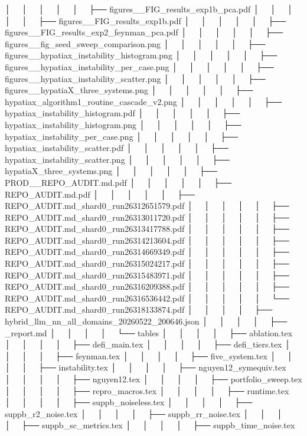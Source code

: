│   │       │   │   │   ├── figures__FIG_results_exp1b_pca.pdf
│   │       │   │   │   ├── figures__FIG_results_exp1b.pdf
│   │       │   │   │   ├── figures__FIG_results_exp2_feynman_pca.pdf
│   │       │   │   │   ├── figures__fig_seed_sweep_comparison.png
│   │       │   │   │   ├── figures__hypatiax_instability_histogram.png
│   │       │   │   │   ├── figures__hypatiax_instability_per_case.png
│   │       │   │   │   ├── figures__hypatiax_instability_scatter.png
│   │       │   │   │   ├── figures__hypatiaX_three_systems.png
│   │       │   │   │   ├── hypatiax_algorithm1_routine_cascade_v2.png
│   │       │   │   │   ├── hypatiax_instability_histogram.pdf
│   │       │   │   │   ├── hypatiax_instability_histogram.png
│   │       │   │   │   ├── hypatiax_instability_per_case.png
│   │       │   │   │   ├── hypatiax_instability_scatter.pdf
│   │       │   │   │   ├── hypatiax_instability_scatter.png
│   │       │   │   │   ├── hypatiaX_three_systems.png
│   │       │   │   │   ├── PROD__REPO_AUDIT.md.pdf
│   │       │   │   │   ├── REPO_AUDIT.md.pdf
│   │       │   │   │   ├── REPO_AUDIT.md_shard0_run26312651579.pdf
│   │       │   │   │   ├── REPO_AUDIT.md_shard0_run26313011720.pdf
│   │       │   │   │   ├── REPO_AUDIT.md_shard0_run26313417788.pdf
│   │       │   │   │   ├── REPO_AUDIT.md_shard0_run26314213604.pdf
│   │       │   │   │   ├── REPO_AUDIT.md_shard0_run26314669349.pdf
│   │       │   │   │   ├── REPO_AUDIT.md_shard0_run26315024217.pdf
│   │       │   │   │   ├── REPO_AUDIT.md_shard0_run26315483971.pdf
│   │       │   │   │   ├── REPO_AUDIT.md_shard0_run26316209388.pdf
│   │       │   │   │   ├── REPO_AUDIT.md_shard0_run26316536442.pdf
│   │       │   │   │   └── REPO_AUDIT.md_shard0_run26318133874.pdf
│   │       │   │   ├── hybrid_llm_nn_all_domains_20260522_200646.json
│   │       │   │   ├── _report.md
│   │       │   │   └── tables
│   │       │   │       ├── ablation.tex
│   │       │   │       ├── defi_main.tex
│   │       │   │       ├── defi_tiers.tex
│   │       │   │       ├── feynman.tex
│   │       │   │       ├── five_system.tex
│   │       │   │       ├── instability.tex
│   │       │   │       ├── nguyen12_symequiv.tex
│   │       │   │       ├── nguyen12.tex
│   │       │   │       ├── portfolio_sweep.tex
│   │       │   │       ├── repro_macros.tex
│   │       │   │       ├── runtime.tex
│   │       │   │       ├── suppb_noiseless.tex
│   │       │   │       ├── suppb_r2_noise.tex
│   │       │   │       ├── suppb_rr_noise.tex
│   │       │   │       ├── suppb_sc_metrics.tex
│   │       │   │       ├── suppb_time_noise.tex
